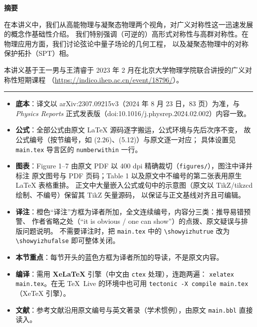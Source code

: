 \thispagestyle{plain}
\begin{center}
  {\bfseries\large 摘\quad 要}
\end{center}
\vspace{0.3em}

在本讲义中，我们从高能物理与凝聚态物理两个视角，对广义对称性这一迅速发展的概念作基础性介绍。
我们特别强调（可逆的）高形式对称性与高群对称性。在物理应用方面，我们讨论弦论中量子场论的几何工程，
以及凝聚态物理中的对称保护拓扑（SPT）相。

本讲义基于王一男与王清睿于 2023 年 2 月在北京大学物理学院联合讲授的广义对称性短期课程
（\url{https://indico.ihep.ac.cn/event/18796/}）。

\vspace{1.2em}
\noindent\rule{\linewidth}{0.4pt}
\vspace{0.4em}


\begin{itemize}[leftmargin=1.4em,itemsep=2pt,topsep=2pt]
  \item \textbf{底本}：译文以 arXiv:2307.09215v3（2024 年 8 月 23 日，83 页）为准，与
        \emph{Physics Reports} 正式发表版（doi:10.1016/j.physrep.2024.02.002）内容一致。
  \item \textbf{公式}：全部公式由原文 LaTeX 源码逐字搬运，公式环境与先后次序不变，
        故公式编号（按节编号，如 (2.26)、(5.12)）与原文逐一对应；
        具体设置见 \texttt{main.tex} 导言区的 \texttt{numberwithin} 一行。
  \item \textbf{图表}：Figure 1--7 由原文 PDF 以 400 dpi 精确裁切（\texttt{figures/}），图注中译并标注
        原文图号与 PDF 页码；Table 1 以及原文中不编号的第二张表用原生 \LaTeX{} 表格重排。
        正文中大量嵌入公式或句中的示意图（原文以 TikZ/tikzcd 绘制、不编号）保留其 TikZ 矢量源码，
        以保证与正文基线对齐且可编辑。
  \item \textbf{译注}：橙色“译注”方框为译者所加，全文连续编号，内容分三类：推导易错预警、
        作者省略之处（“it is obvious / one can show”）的点拨、原文疑误与排版问题说明。
        不需要译注时，把 \texttt{main.tex} 中的 \verb|\showyizhutrue| 改为 \verb|\showyizhufalse| 即可整体关闭。
  \item \textbf{本节重点}：每节开头的蓝色方框为译者所加的导读，不是原文内容。
  \item \textbf{编译}：需用 \textbf{XeLaTeX} 引擎（中文由 \texttt{ctex} 处理），连跑两遍：
        \texttt{xelatex main.tex}。在无 TeX~Live 的环境中也可用
        \texttt{tectonic -X compile main.tex}（XeTeX 引擎）。
  \item \textbf{文献}：参考文献沿用原文编号与英文著录（学术惯例），由原文 \texttt{main.bbl} 直接读入。
\end{itemize}

\vspace{0.6em}

\clearpage
\tableofcontents
\clearpage
